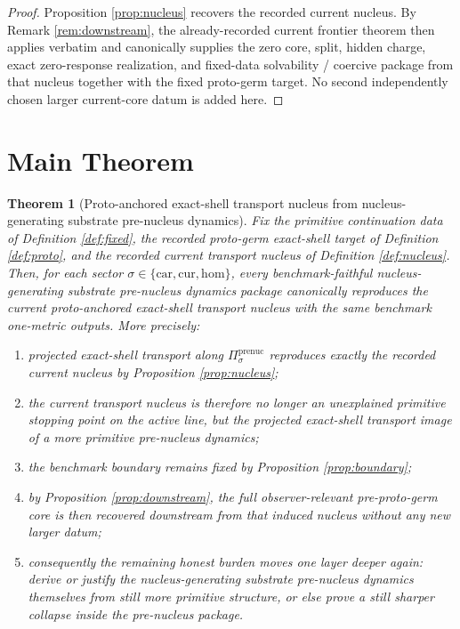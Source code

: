 \documentclass[11pt]{article}
\newcommand{\Car}{\mathrm{car}}
\newcommand{\Cur}{\mathrm{cur}}
\newcommand{\Hom}{\mathrm{hom}}
\newcommand{\PreNucProj}[1]{\Pi_{#1}^{\mathrm{prenuc}}}
\newtheorem{theorem}{Theorem}
\begin{document}
\begin{proof}
Proposition \ref{prop:nucleus} recovers the recorded current nucleus. By Remark \ref{rem:downstream}, the already-recorded current frontier theorem then applies verbatim and canonically supplies the zero core, split, hidden charge, exact zero-response realization, and fixed-data solvability / coercive package from that nucleus together with the fixed proto-germ target. No second independently chosen larger current-core datum is added here.
\end{proof}

\section{Main Theorem}

\begin{theorem}[Proto-anchored exact-shell transport nucleus from nucleus-generating substrate pre-nucleus dynamics]
\label{thm:main}
Fix the primitive continuation data of Definition \ref{def:fixed}, the recorded proto-germ exact-shell target of Definition \ref{def:proto}, and the recorded current transport nucleus of Definition \ref{def:nucleus}. Then, for each sector \(\sigma\in\{\Car,\Cur,\Hom\}\), every benchmark-faithful nucleus-generating substrate pre-nucleus dynamics package canonically reproduces the current proto-anchored exact-shell transport nucleus with the same benchmark one-metric outputs. More precisely:
\begin{enumerate}
    \item projected exact-shell transport along \(\PreNucProj{\sigma}\) reproduces exactly the recorded current nucleus by Proposition \ref{prop:nucleus};
    \item the current transport nucleus is therefore no longer an unexplained primitive stopping point on the active line, but the projected exact-shell transport image of a more primitive pre-nucleus dynamics;
    \item the benchmark boundary remains fixed by Proposition \ref{prop:boundary};
    \item by Proposition \ref{prop:downstream}, the full observer-relevant pre-proto-germ core is then recovered downstream from that induced nucleus without any new larger datum;
    \item consequently the remaining honest burden moves one layer deeper again: derive or justify the nucleus-generating substrate pre-nucleus dynamics themselves from still more primitive structure, or else prove a still sharper collapse inside the pre-nucleus package.
\end{enumerate}
\end{theorem}
\end{document}

